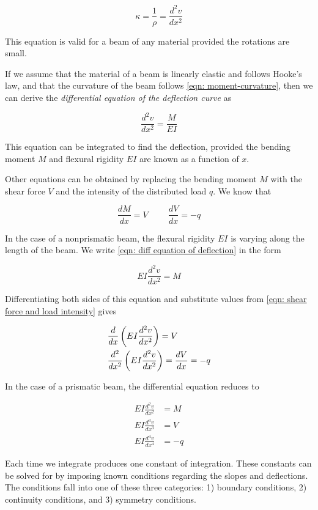 \documentclass[a4paper,openany,nobib]{tufte-book}
\begin{document}
\begin{enumerate}
$$\kappa  = \frac{1}{\rho } = \frac{d^2v}{dx^2}$$

This equation is valid for a beam of any material provided the rotations
are small.

If we assume that the material of a beam is linearly elastic and follows
Hooke's law, and that the curvature of the beam follows
\ref{eqn: moment-curvature}, then we can derive
the \emph{differential equation of the deflection curve} as

$$\frac{d^2v}{dx^2} = \frac{M}{EI}$$

This equation can be integrated to find the deflection, provided the
bending moment \(M\) and flexural rigidity \(EI\) are known as a function of
\(x\).

Other equations can be obtained by replacing the bending moment \(M\) with
the shear force \(V\) and the intensity of the distributed load \(q\). We
know that

$$\frac{dM}{dx} = V \hspace{1cm} \frac{dV}{dx} =  - q$$

In the case of a nonprismatic beam, the flexural rigidity \(EI\) is
varying along the length of the beam. We write
\ref{eqn: diff equation of deflection}
in the form

$$EI\frac{d^2v}{dx^2} = M$$

Differentiating both sides of this equation and substitute values from
\ref{eqn: shear force and load intensity}
gives

$$\begin{gathered}
    \frac{d}{dx}\left( EI\frac{d^2v}{dx^2} \right) = V \hfill \\
    \frac{d^2}{dx^2}\left( EI\frac{d^2v}{dx^2} \right) = \frac{dV}{dx} =  -q \hfill \\ 
  \end{gathered}$$

In the case of a prismatic beam, the differential equation reduces to

$$\begin{aligned}
  EI\frac{d^2v}{dx^2} &= M \nonumber \\
  EI\frac{d^3v}{dx^3} &= V \nonumber \\
  EI\frac{d^4v}{dx^4} &=  - q \end{aligned}$$

Each time we integrate produces one constant of integration. These
constants can be solved for by imposing known conditions regarding the
slopes and deflections. The conditions fall into one of these three
categories: 1) boundary conditions, 2) continuity conditions, and 3)
symmetry conditions.


\end{enumerate}
\end{document}
